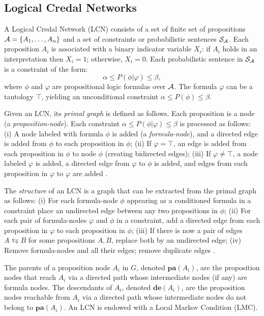 \documentclass{article}
\begin{document}
\subsection{Logical Credal Networks}

A Logical Credal Network (LCN) \cite{marinescu2022neurips} consists of a set of finite set of propositions $\mathcal{A} = \{A_1, \dots, A_n \}$ and a set of constraints or probabilistic sentences $\mathcal{S}_{\mathcal{A}}$. Each proposition $A_i$ is associated with a binary indicator variable $X_i$: if $A_i$ holds in an interpretation then $X_i=1$; otherwise, $X_i=0$. Each probabilistic sentence in $\mathcal{S}_{\mathcal{A}}$ is a constraint of the form:
\begin{equation}
\alpha \leq P(\phi|\varphi) \leq \beta,
\end{equation}
where $\phi$ and $\varphi$ are propositional logic formulas over $\mathcal{A}$. The formula $\varphi$ can be a tautology $\top$, yielding an unconditional constraint $\alpha \leq P(\phi) \leq \beta$. 

Given an LCN, its \emph{primal graph} is defined as follows. Each proposition is a node (a \emph{proposition-node}). Each constraint $\alpha \leq P(\phi|\varphi) \leq \beta$ is processed as follows: (i) A node labeled with formula $\phi$ is added (a \emph{formula-node}), and a directed edge is added from $\phi$ to each proposition in $\phi$; (ii) If $\varphi = \top$, an edge is added from each proposition in $\phi$ to node $\phi$ (creating bidirected edges); (iii) If $\varphi \neq \top$, a node labeled $\varphi$ is added, a directed edge from $\varphi$ to $\phi$ is added, and edges from each proposition in $\varphi$ to $\varphi$ are added \cite{marinescu2022neurips}.

The \emph{structure} of an LCN is a graph that can be extracted from the primal graph as follows:
(i) For each formula-node $\phi$ appearing as a conditioned formula in a constraint place an undirected edge between any two propositions in $\phi$; (ii) For each pair of formula-nodes $\varphi$ and $\phi$ in a constraint, add a directed edge from each proposition in $\varphi$ to each proposition in $\phi$; (iii) If there is now a pair of edges $A \leftrightarrows B$ for some propositions $A, B$, replace both by an undirected edge; (iv) Remove formula-nodes and all their edges; remove duplicate edges \cite{cozman23a}.

The parents of a proposition node $A_i$ in $G$, denoted $\mathbf{pa}(A_i)$, are the proposition nodes that reach $A_i$ via a directed path whose intermediate nodes (if any) are formula nodes. The descendants of $A_i$, denoted $\mathbf{de}(A_i)$, are the proposition nodes reachable from $A_i$ via a directed path whose intermediate nodes do not belong to $\mathbf{pa}({A_i})$. An LCN is endowed with a Local Markov Condition (LMC).
\end{document}
